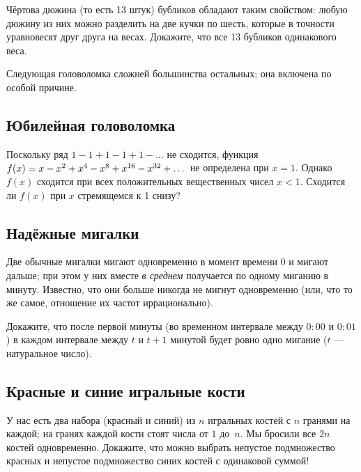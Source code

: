Чёртова дюжина (то есть 13 штук) бубликов обладают таким свойством: любую дюжину из них можно разделить на две кучки по шесть, которые в точности уравновесят друг друга на весах.
Докажите, что все 13 бубликов одинакового веса.

\medskip

Следующая головоломка сложней большинства остальных;
она включена по особой причине.

\subsection*{Юбилейная головоломка}

Поскольку ряд $1 - 1 + 1 - 1 + 1 - \dots$ не сходится,  функция 
$f(x)\z=x-x^2+x^4-x^8+x^{16}-x^{32}+\dots$ не определена при $x=1$.
Однако $f(x)$ сходится при всех положительных вещественных чисел $x<1$.
Сходится ли $f(x)$ при $x$ стремящемся к 1 снизу?

\subsection*{Надёжные мигалки}\label{Надёжные мигалки}

Две обычные мигалки мигают одновременно в момент времени $0$
и мигают дальше; при этом у них вместе \emph{в среднем} получается по одному миганию в минуту.
Известно, что они больше никогда не мигнут одновременно (или, что то же самое, отношение их частот иррационально).

Докажите, что после первой минуты (во временном интервале между $0{:}00$ и $0{:}01$) в каждом интервале между $t$ и $t + 1$ минутой будет ровно одно мигание ($t$ --- натуральное число).

\subsection*{Красные и синие игральные кости}\label{Красные и синие игральные кости}

У нас есть два набора (красный и синий) из $n$ игральных костей с $n$ гранями на каждой;
на гранях каждой кости стоят числа от $1$ до~$n$.
Мы бросили все $2n$ костей одновременно.
Докажите, что можно выбрать непустое подмножество красных и непустое подмножество синих костей с одинаковой суммой!
